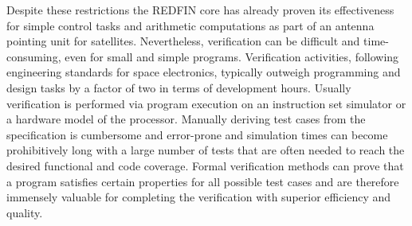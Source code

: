 Despite these restrictions the REDFIN core has already proven its effectiveness for
simple control tasks and arithmetic computations as part of an antenna pointing unit
for satellites. Nevertheless, verification can be difficult and time-consuming,
even for small and simple programs. Verification activities, following engineering
standards for space electronics, typically outweigh programming and design tasks by a
factor of two in terms of development hours. Usually verification is performed via
program execution on an instruction set simulator or a hardware model of the processor.
Manually deriving test cases from the specification is cumbersome and error-prone
and simulation times can become prohibitively long with a large number of tests that
are often needed to reach the desired functional and code coverage. Formal verification
methods can prove that a program satisfies certain properties for all possible
test cases and are therefore immensely valuable for completing the verification
with superior efficiency and quality.

